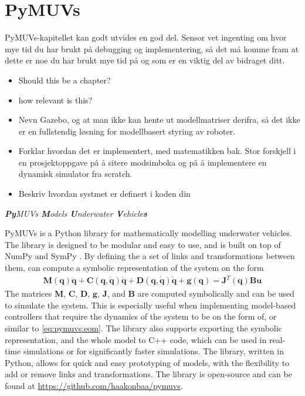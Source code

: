 \chapter{PyMUVs}

{
\color{red}
PyMUVs-kapitellet kan godt utvides en god del. Sensor vet ingenting om hvor mye tid du har brukt på debugging og implementering, så det må komme fram at dette er noe du har brukt mye tid på og som er en viktig del av bidraget ditt.
\begin{itemize}
    \item Should this be a chapter?
    \item how relevant is this?
    \item Nevn Gazebo, og at man ikke kan hente ut modellmatriser derifra, så det ikke er en fullstendig løsning for modellbasert styring av roboter.
    \item Forklar hvordan det er implementert, med matematikken bak. Stor forskjell i en prosjektoppgave på å sitere modsimboka og på å implementere en dynamisk simulator fra scratch.
    \item Beskriv hvordan systmet er definert i koden din
\end{itemize}
}

\emph{\textbf{Py}MUVs \textbf{M}odels \textbf{U}nderwater \textbf{V}ehicle\textbf{s}}
\newline

PyMUVs is a Python library for mathematically modelling underwater vehicles. The
library is designed to be modular and easy to use, and is built on top of NumPy
\cite{numpy} and SymPy \cite{sympy}. By defining the a set of links and transformations
between them, \pymuvs can compute a symbolic representation of the system on the
form
\begin{align}
    \bm{M}(\bm{q}) \ddot{\bm{q}} + \bm{C}(\bm{q}, \dot{\bm{q}}) \dot{\bm{q}} +
    \bm{D}(\bm{q}, \dot{\bm{q}}) \dot{\bm{q}} + \bm{g}(\bm{q}) = \bm{J}^T(\bm{q}) \bm{B} \bm{u}
    \label{eq:pymuvs:eom}
\end{align}
The matrices $\bm{M}$, $\bm{C}$, $\bm{D}$, $\bm{g}$, $\bm{J}$, and $\bm{B}$ are
computed symbolically and can be used to simulate the system. This is especially
useful when implementing model-based controllers that require the dynamics of the
system to be on the form of, or similar to \autoref{eq:pymuvs:eom}. The library
also supports exporting the symbolic representation, and the whole model to C++
code, which can be used in real-time simulations or for significantly faster
simulations.
The library, written in Python, allows for quick and easy prototyping of
models, with the flexibility to add or remove links and transformations.
The library is open-source and can be found at
\url{https://github.com/haakonbaa/pymuvs}. 

